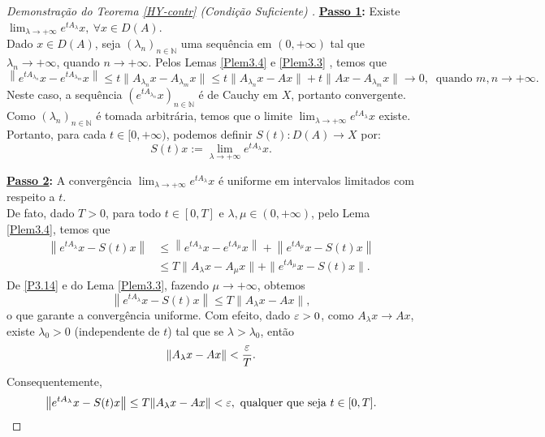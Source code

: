 \begin{proof}[Demonstração do Teorema {\ref{HY-contr}} (Condição Suficiente) ]
\noindent

\noindent\textbf{\underline{Passo 1}:} Existe $\displaystyle\lim_{\lambda \to +\infty} e^{tA_\lambda}x, \ \forall x\in D(A)$.
\\

Dado $x\in D(A)$, seja  $(\lambda_n)_{n\in\mathbb N}$  uma sequência  em $(0,+\infty)$ tal que 
$\lambda_n\to +\infty$,  quando $n\to +\infty$.
Pelos Lemas  \ref{Plem3.4} e \ref{Plem3.3} , temos que
\begin{equation*}
\left\|e^{tA_{\lambda_n}}x-e^{tA_{\lambda_m}}x\right\|
\leq t\|A_{\lambda_n} x-A_{\lambda_m} x\|
\leq  t\|A_{\lambda_n} x-A x\|+ t\|A x-A_{\lambda_m} x\|\to 0,\ 
\text{ quando } m,n \to +\infty.
\end{equation*}
Neste caso, a sequência $(e^{tA_{\lambda_n}}x)_{n\in\mathbb N}$ é de Cauchy em $X$, portanto 
convergente. Como $(\lambda_n)_{n\in\mathbb N}$ é tomada arbitrária, temos que o 
limite $\displaystyle\lim_{\lambda \to +\infty} e^{tA_\lambda}x$ existe.
Portanto, para cada $t\in[0,+\infty)$, podemos definir $S(t):D(A)\longrightarrow 
X$ por:
\begin{equation}\label{P3.14}
S(t)x:=\lim_{\lambda \to +\infty} e^{tA_\lambda}x.
\end{equation}

\noindent\textbf{\underline{Passo 2}:} A convergência  
$\displaystyle\lim_{\lambda \to +\infty} e^{tA_\lambda}x$ é uniforme em 
intervalos limitados com respeito a $t$. 
\\


De fato, 
dado $T>0$, para todo $t\in [0,T]$ e $\lambda,\mu\in 
(0,+\infty)$, pelo Lema \ref{Plem3.4}, temos que
\begin{align*}
\left\|e^{tA_{\lambda}}x-S(t)x\right\|
& \leq \left\|e^{tA_{\lambda}}x-e^{tA_{\mu}}x\right\|
+\left\|e^{tA_{\mu}}x-S(t)x\right\|\\
& \leq  T\|A_{\lambda} x-A_\mu x\|+ \|e^{tA_{\mu}}x-S(t)x\|.
\end{align*}
De \eqref{P3.14} e do Lema \ref{Plem3.3}, fazendo $\mu\to +\infty$, obtemos
\begin{equation*}
\left\|e^{tA_{\lambda}}x-S(t)x\right\|
 \leq  T\|A_{\lambda} x-Ax\|, 
\end{equation*}
o que garante a convergência uniforme. Com efeito, dado $\varepsilon>0$, como 
$A_\lambda x\to Ax$, existe $\lambda_0>0$ (independente de $t$) tal que se $\lambda>\lambda_0$, então
\[\|A_{\lambda} x-Ax\|< \frac{\varepsilon}{T}.\]
Consequentemente, 
\begin{equation*}
\left\|e^{tA_{\lambda}}x-S(t)x\right\|
 \leq  T\|A_{\lambda} x-Ax\|<\varepsilon, \text{ qualquer que seja } t\in [0,T]. 
\end{equation*}




\end{proof}
